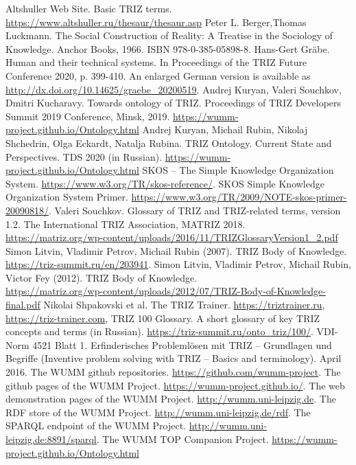 \documentclass[11pt,a4paper]{article}
\begin{document}
\begin{thebibliography}{xxx}
  \raggedright
{} Altshuller Web Site. Basic TRIZ terms.
  \url{https://www.altshuller.ru/thesaur/thesaur.asp}
 Peter L. Berger,Thomas Luckmann. The Social
  Construction of Reality: A Treatise in the Sociology of Knowledge. Anchor
  Books, 1966. ISBN 978-0-385-05898-8.
 Hans-Gert Gr\"abe. Human and their technical systems.  In
  Proceedings of the TRIZ Future Conference 2020, p. 399-410.  An enlarged
  German version is available as
  \url{http://dx.doi.org/10.14625/graebe_20200519}. 
 Andrej Kuryan, Valeri Souchkov, Dmitri Kucharavy. Towards
  ontology of TRIZ. Proceedings of TRIZ Developers Summit 2019 Conference,
  Minsk, 2019.  \url{https://wumm-project.github.io/Ontology.html}
 Andrej Kuryan, Michail Rubin, Nikolaj Shchedrin, Olga
  Eckardt, Natalja Rubina.  TRIZ Ontology. Current State and Perspectives. TDS
  2020 (in Russian).  \url{https://wumm-project.github.io/Ontology.html}
 SKOS -- The Simple Knowledge Organization System.
  \url{https://www.w3.org/TR/skos-reference/}.  
 SKOS Simple Knowledge Organization System Primer.
  \url{https://www.w3.org/TR/2009/NOTE-skos-primer-20090818/}.  
 Valeri Souchkov. Glossary of TRIZ and TRIZ-related
  terms, version 1.2.  The International TRIZ Association, MATRIZ
  2018.\\ \url{https://matriz.org/wp-content/uploads/2016/11/TRIZGlossaryVersion1_2.pdf}
 Simon Litvin, Vladimir Petrov, Michail Rubin (2007). TRIZ
  Body of Knowledge. \\ \url{https://triz-summit.ru/en/203941}.
 Simon Litvin, Vladimir Petrov, Michail Rubin, Victor Fey
  (2012). TRIZ Body of
  Knowledge. \\ \url{https://matriz.org/wp-content/uploads/2012/07/TRIZ-Body-of-Knowledge-final.pdf}
 Nikolai Shpakovski et al. The TRIZ Trainer.
  \url{https://triztrainer.ru}, \url{https://triz-trainer.com},
 TRIZ 100 Glossary. A short glossary of key TRIZ
  concepts and terms (in Russian).
  \url{https://triz-summit.ru/onto_triz/100/}.
 VDI-Norm 4521 Blatt 1. Erfinderisches Problemlösen mit TRIZ --
  Grundlagen und Begriffe (Inventive problem solving with TRIZ -- Basics and
  terminology). April 2016.
 The WUMM github repositories.
  \url{https://github.com/wumm-project}. 
 The github pages of the WUMM Project.
  \url{https://wumm-project.github.io/}. 
 The web demonstration pages of the WUMM Project.
  \url{http://wumm.uni-leipzig.de}.
 The RDF store of the WUMM Project.
  \url{http://wumm.uni-leipzig.de/rdf}.
 The SPARQL endpoint of the WUMM Project.
  \url{http://wumm.uni-leipzig.de:8891/sparql}.
 The WUMM TOP Companion Project.
  \url{https://wumm-project.github.io/Ontology.html}
\end{thebibliography}
\end{document}
